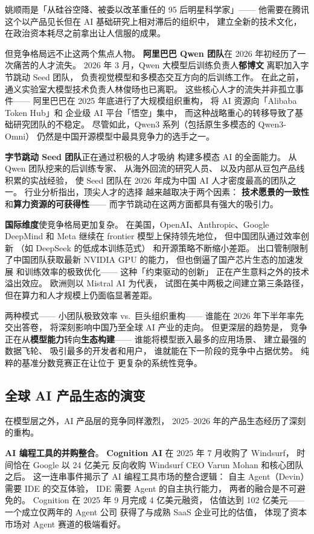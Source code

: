 姚顺雨是「从硅谷空降、被委以改革重任的 95 后明星科学家」——
他需要在腾讯这个以产品见长但在 AI 基础研究上相对滞后的组织中，
建立全新的技术文化，
在政治资本耗尽之前拿出让人信服的成果。

但竞争格局远不止这两个焦点人物。
\textbf{阿里巴巴 Qwen 团队}在 2026 年初经历了一次痛苦的人才流失。
2026 年 3 月，Qwen 大模型后训练负责人\textbf{郁博文}
离职加入字节跳动 Seed 团队，
负责视觉模型和多模态交互方向的后训练工作。
在此之前，通义实验室大模型技术负责人林俊旸也已离职。
这些核心人才的流失并非孤立事件——
阿里巴巴在 2025 年底进行了大规模组织重构，
将 AI 资源向「Alibaba Token Hub」和
企业级 AI 平台「悟空」集中，
而这种战略重心的转移导致了基础研究团队的不稳定。
尽管如此，Qwen3 系列（包括原生多模态的 Qwen3-Omni）
仍然是中国开源模型中最具竞争力的选手之一。

\textbf{字节跳动 Seed 团队}正在通过积极的人才吸纳
构建多模态 AI 的全面能力。
从 Qwen 团队挖来的后训练专家、
从海外回流的研究人员、
以及内部从豆包产品线积累的实战经验，
使 Seed 团队在 2026 年成为中国 AI 人才密度最高的团队之一。
行业分析指出，顶尖人才的选择
越来越取决于两个因素：
\textbf{技术愿景的一致性}
和\textbf{算力资源的可获得性}——
而字节跳动在这两方面都具有强大的吸引力。

\textbf{国际维度}使竞争格局更加复杂。
在美国，OpenAI、Anthropic、Google DeepMind 和 Meta
继续在 frontier 模型上保持领先地位，
但中国团队通过效率创新
（如 DeepSeek 的低成本训练范式）
和开源策略不断缩小差距。
出口管制限制了中国团队获取最新 NVIDIA GPU 的能力，
但也倒逼了国产芯片生态的加速发展
和训练效率的极致优化——
这种「约束驱动的创新」
正在产生意料之外的技术溢出效应。
欧洲则以 Mistral AI 为代表，
试图在美中两极之间建立第三条路径，
但在算力和人才规模上仍面临显著差距。

两种模式——
小团队极致效率 vs.\ 巨头组织重构——
谁能在 2026 年下半年率先交出答卷，
将深刻影响中国乃至全球 AI 产业的走向。
但更深层的趋势是，
竞争正在从\textbf{模型能力}转向\textbf{生态构建}——
谁能将模型嵌入最多的应用场景、
建立最强的数据飞轮、
吸引最多的开发者和用户，
谁就能在下一阶段的竞争中占据优势。
纯粹的基准分数竞赛正在让位于
更复杂的系统性竞争。

\subsection{全球 AI 产品生态的演变}

在模型层之外，AI 产品层的竞争同样激烈，
2025--2026 年的产品生态经历了深刻的重构。

\textbf{AI 编程工具的并购整合}。
\textbf{Cognition AI} 在 2025 年 7 月收购了 Windsurf，
时间恰在 Google 以 24 亿美元
反向收购 Windsurf CEO Varun Mohan 和核心团队之后。
这一连串事件揭示了 AI 编程工具市场的整合逻辑：
自主 Agent（Devin）需要 IDE 的交互体验，
IDE 需要 Agent 的自主执行能力，
两者的融合是不可避免的。
Cognition 在 2025 年 9 月完成 4 亿美元融资，
估值达到 102 亿美元——
一个成立仅两年的 Agent 公司
获得了与成熟 SaaS 企业可比的估值，
体现了资本市场对 Agent 赛道的极端看好。

